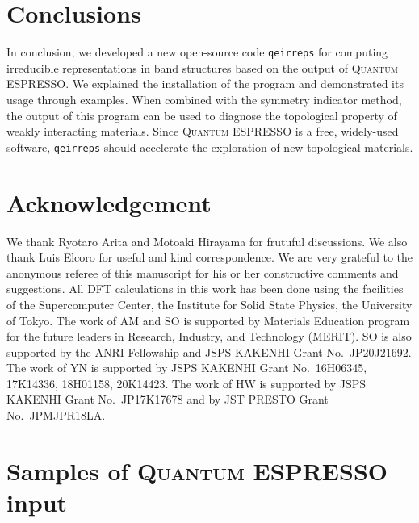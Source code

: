 \documentclass[3p,preprint]{elsarticle}
\newcommand{\akishi}[1]{ { \color{magenta} \footnotesize (\textsf{AM}) \textsf{\textsl{#1}} } }
\begin{document}
\section{Conclusions}\label{sec5}
In conclusion, we developed a new open-source code \texttt{qeirreps} for computing irreducible representations in band structures based on the output of \textsc{Quantum ESPRESSO}. 
We explained the installation of the program and demonstrated its usage through examples. 
When combined with the symmetry indicator method, the output of this program can be used to diagnose the topological property of weakly interacting materials.
Since \textsc{Quantum ESPRESSO} is a free, widely-used software,
\texttt{qeirreps} should accelerate the exploration of new topological materials.  


\section*{Acknowledgement}
We thank Ryotaro Arita and Motoaki Hirayama for frutuful discussions. We also thank Luis Elcoro for useful and kind correspondence. We are very grateful to the anonymous referee of this manuscript for his or her constructive comments and suggestions. All DFT calculations in this work has been done using the facilities of the Supercomputer Center, the Institute for Solid State Physics, the University of Tokyo.
The work of AM and SO is supported by Materials Education program for the future leaders in Research, Industry, and Technology (MERIT). 
SO is also supported by the ANRI Fellowship and JSPS KAKENHI Grant No.~JP20J21692.
The work of YN is supported by JSPS KAKENHI Grant No.~16H06345, 17K14336, 18H01158, 20K14423. 
The work of HW is supported by JSPS KAKENHI Grant No.~JP17K17678 and by JST PRESTO Grant No.~JPMJPR18LA.

\appendix

\section{Samples of \textsc{Quantum ESPRESSO} input}
\end{document}
